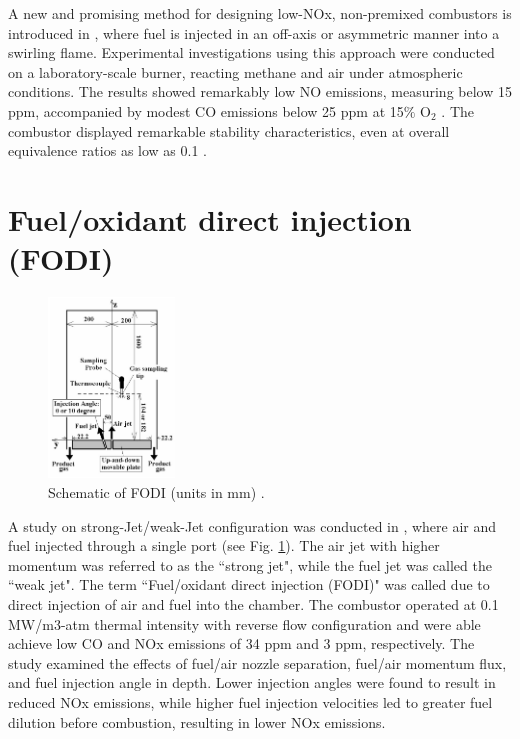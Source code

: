 A new and promising method for designing low-NOx, non-premixed combustors is introduced in \cite{YETTER20001265}, where fuel is injected in an off-axis or asymmetric manner into a swirling flame. Experimental investigations using this approach were conducted on a laboratory-scale burner, reacting methane and air under atmospheric conditions. The results showed remarkably low NO emissions, measuring below 15 ppm, accompanied by modest CO emissions below 25 ppm at 15$\%$ O$_2$ \cite{YETTER20001265}. The combustor displayed remarkable stability characteristics, even at overall equivalence ratios as low as 0.1 \cite{YETTER20001265}.

\section{Fuel/oxidant direct injection (FODI)}
\begin{figure}
\vspace{-10mm}
    \centering
    \includegraphics[width=0.3\textwidth]{Chapter2/Images/FODI.jpeg}
  \caption[Schematic of FODI]{Schematic of FODI (units in mm) \cite{He2008FlamelessCO}.}
  \label{fig:FODI}
\end{figure}

A study on strong-Jet/weak-Jet configuration was conducted in \cite{He2008FlamelessCO}, where air and fuel injected through a single port (see Fig. \ref{fig:FODI}). The air jet with higher momentum was referred to as the ``strong jet", while the fuel jet was called the ``weak jet". The term ``Fuel/oxidant direct injection (FODI)" was called due to direct injection of air and fuel into the chamber. The combustor operated at 0.1 MW/m3-atm thermal intensity with reverse flow configuration and were able achieve low CO and NOx emissions of 34 ppm and 3 ppm, respectively. The study examined the effects of fuel/air nozzle separation, fuel/air momentum flux, and fuel injection angle in depth. Lower injection angles were found to result in reduced NOx emissions, while higher fuel injection velocities led to greater fuel dilution before combustion, resulting in lower NOx emissions. 

